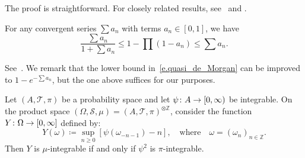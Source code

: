 \documentclass[AHL,Unicode,longabstracts,published]{cedram}
\newcommand{\Z}{\mathbb{Z}}
\newcommand{\clS}{\mathcal{S}}
\newcommand{\clT}{\mathcal{T}}
\renewcommand*{\to}{\mathchoice{\longrightarrow}{\rightarrow}{\rightarrow}{\rightarrow}}
\begin{document}
The proof is straightforward. For closely related results, see~\cite[Section~5]{kifer} and \cite[p.~161]{arnold}.


\begin{lemm}\label{l.Weierstrass}
For any convergent series $\sum a_n$ with terms $a_n \in [0,1]$, we have
\begin{equation}\label{e.quasi_de_Morgan}
\frac{\sum a_n}{1 + \sum a_n} \le 1 - \prod (1-a_n) \le \sum a_n.
\end{equation}
\end{lemm}

See~\cite[Section~38]{Bromwich}. We remark that the lower bound in~\eqref{e.quasi_de_Morgan} can be improved to $1 - e^{-\sum a_n}$, but the one above suffices for our purposes.


\begin{lemm}\label{l.double-edged}
Let $(A,\clT,\pi)$ be a probability space and let $\psi \colon A \to [0,\infty)$ be integrable. On the product space $(\Omega,\clS,\mu) = (A,\clT,\pi)^{\otimes \Z}$, consider the function $Y \colon \Omega \to [0,\infty]$ defined by:
\begin{equation}\label{e.def_Y}
Y(\omega) \coloneqq \sup_{n \ge 0} \left[\psi(\omega_{-n-1}) - n \right], \quad \text{where}\quad \omega = (\omega_n)_{n \in \Z}.
\end{equation}
Then $Y$ is $\mu$-integrable if and only if $\psi^2$ is $\pi$-integrable.
\end{lemm}
\end{document}
